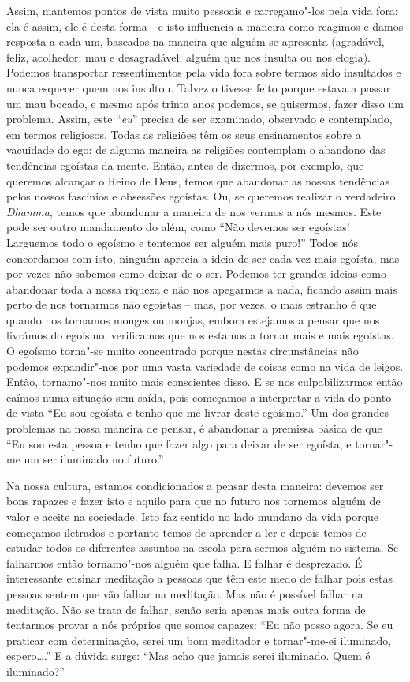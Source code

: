 Assim, mantemos pontos de vista muito pessoais e carregamo"-los pela vida
fora: ela é assim, ele é desta forma - e isto influencia a maneira como
reagimos e damos resposta a cada um, baseados na maneira que alguém se
apresenta (agradável, feliz, acolhedor; mau e desagradável; alguém que
nos insulta ou nos elogia). Podemos transportar ressentimentos pela vida
fora sobre termos sido insultados e nunca esquecer quem nos insultou.
Talvez o tivesse feito porque estava a passar um mau bocado, e mesmo
após trinta anos podemos, se quisermos, fazer disso um problema. Assim,
este ``\emph{eu}'' precisa de ser examinado, observado e contemplado, em
termos religiosos. Todas as religiões têm os seus ensinamentos sobre a
vacuidade do ego: de alguma maneira as religiões contemplam o abandono
das tendências egoístas da mente. Então, antes de dizermos, por exemplo,
que queremos alcançar o Reino de Deus, temos que abandonar as nossas
tendências pelos nossos fascínios e obsessões egoístas. Ou, se queremos
realizar o verdadeiro \emph{Dhamma}, temos que abandonar a maneira de
nos vermos a nós mesmos. Este pode ser outro mandamento do além, como
``Não devemos ser egoístas! Larguemos todo o egoísmo e tentemos ser
alguém mais puro!'' Todos nós concordamos com isto, ninguém aprecia a
ideia de ser cada vez mais egoísta, mas por vezes não sabemos como
deixar de o ser. Podemos ter grandes ideias como abandonar toda a nossa
riqueza e não nos apegarmos a nada, ficando assim mais perto de nos
tornarmos não egoístas -- mas, por vezes, o mais estranho é que quando
nos tornamos monges ou monjas, embora estejamos a pensar que nos
livrámos do egoísmo, verificamos que nos estamos a tornar mais e mais
egoístas. O egoísmo torna"-se muito concentrado porque nestas
circunstâncias não podemos expandir"-nos por uma vasta variedade de
coisas como na vida de leigos. Então, tornamo"-nos muito mais conscientes
disso. E se nos culpabilizarmos então caímos numa situação sem saída,
pois começamos a interpretar a vida do ponto de vista ``Eu sou egoísta e
tenho que me livrar deste egoísmo.'' Um dos grandes problemas na nossa
maneira de pensar, é abandonar a premissa básica de que ``Eu sou esta
pessoa e tenho que fazer algo para deixar de ser egoísta, e tornar"-me um
ser iluminado no futuro.''

Na nossa cultura, estamos condicionados a pensar desta maneira: devemos
ser bons rapazes e fazer isto e aquilo para que no futuro nos tornemos
alguém de valor e aceite na sociedade. Isto faz sentido no lado mundano
da vida porque começamos iletrados e portanto temos de aprender a ler e
depois temos de estudar todos os diferentes assuntos na escola para
sermos alguém no sistema. Se falharmos então tornamo"-nos alguém que
falha. E falhar é desprezado. É interessante ensinar meditação a pessoas
que têm este medo de falhar pois estas pessoas sentem que vão falhar na
meditação. Mas não é possível falhar na meditação. Não se trata de
falhar, senão seria apenas mais outra forma de tentarmos provar a nós
próprios que somos capazes: ``Eu não posso agora. Se eu praticar com
determinação, serei um bom meditador e tornar"-me-ei iluminado,
espero\ldots{}.'' E a dúvida surge: ``Mas acho que jamais serei iluminado.
Quem é iluminado?''


